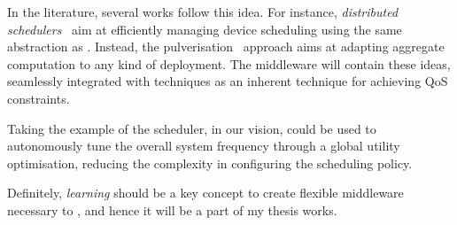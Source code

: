 \documentclass[11pt]{article}
\begin{document}
In the \ac{} literature, several works follow this idea. 
%
For instance, \emph{distributed schedulers}~\cite{DBLP:journals/corr/abs-2012-13806} aim at efficiently managing device scheduling using the same abstraction as \ac{}.
Instead, the pulverisation~\cite{DBLP:journals/fi/CasadeiPPVW20} approach aims at adapting aggregate computation to any kind of deployment.
%
The middleware will contain these ideas, seamlessly integrated with \rl{} techniques as an inherent technique for achieving  QoS constraints.

Taking the example of the scheduler, in our vision, \rl{} could be used to autonomously tune the overall system frequency through a global utility optimisation, reducing the complexity in configuring the scheduling policy.

Definitely, \emph{learning} should be a key concept to create flexible middleware necessary to \cpsw{}, and hence it will be a part of my thesis works. 



\end{document}
